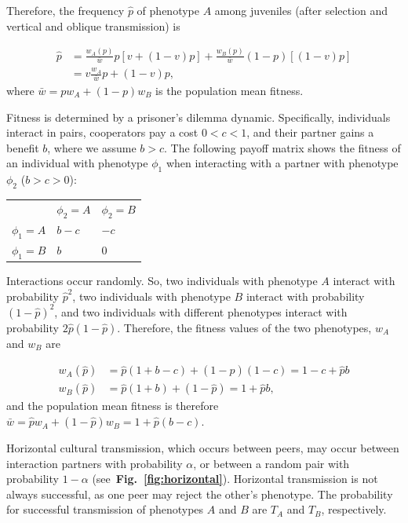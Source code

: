 \documentclass{article}
\begin{document}
Therefore, the frequency $\hat{p}$ of  phenotype $A$ among juveniles (after selection and vertical and oblique transmission) is

\begin{equation}\label{eq:horizontal}
\begin{aligned}
\hat{p}
& = \frac{w_A(p)}{\bar{w}} p [v + (1-v)p] + \frac{w_B(p)}{\bar{w}} (1-p) [(1-v)p] \\
& = v \frac{w_A}{\bar{w}} p + (1-v) p,
\end{aligned}
\end{equation}
where $\bar{w}=p w_A + (1-p) w_B$ is the population mean fitness.

Fitness is determined by a prisoner's dilemma dynamic. Specifically, individuals interact in pairs, cooperators pay a cost $0<c<1$, and their partner gains a benefit $b$, where we assume $b>c$. The following payoff matrix shows the fitness of an individual with phenotype $\phi_1$ when interacting with a partner with phenotype $\phi_2$ ($b>c>0$):

\begin{table}[h]\label{table:prisoner_payoff}
\centering
\begin{tabular}{lll}
           & $\phi_2=A$ & $\phi_2=B$ \\
$\phi_1=A$ & $b-c$      & $-c$       \\
$\phi_1=B$ & $b$        & $0$       
\end{tabular}
\end{table}

Interactions occur randomly.
So, two individuals with phenotype $A$ interact with probability $\hat{p}^2$, two individuals with phenotype $B$ interact with probability $(1-\hat{p})^2$, and two individuals with different phenotypes interact with probability $2\hat{p}(1-\hat{p})$. 
Therefore, the fitness values of the two phenotypes, $w_A$ and $w_B$ are

\begin{equation}\label{eq:fitness}
\begin{aligned}
w_A(\hat{p}) & = \hat{p}(1+b-c) + (1-\hat{p})(1-c) = 1 - c + \hat{p} b \\
w_B(\hat{p}) & = \hat{p}(1+b) + (1-\hat{p}) = 1 + \hat{p} b,
\end{aligned}
\end{equation}
and the population mean fitness is therefore
$\bar{w} = \hat{p} w_A + (1-\hat{p}) w_B = 1 + \hat{p}(b-c)$.


Horizontal cultural transmission, which occurs between peers, may occur between interaction partners with probability $\alpha$, or between a random pair with probability $1-\alpha$ (see~\textbf{Fig.~\ref{fig:horizontal}}).
Horizontal transmission is not always successful, as one peer may reject the other's phenotype. The probability for successful transmission of phenotypes $A$ and $B$ are $T_A$ and $T_B$, respectively.
\end{document}
